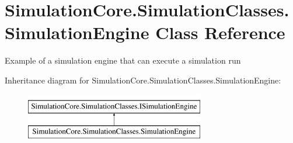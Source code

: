 \hypertarget{class_simulation_core_1_1_simulation_classes_1_1_simulation_engine}{}\section{Simulation\+Core.\+Simulation\+Classes.\+Simulation\+Engine Class Reference}
\label{class_simulation_core_1_1_simulation_classes_1_1_simulation_engine}


Example of a simulation engine that can execute a simulation run  


Inheritance diagram for Simulation\+Core.\+Simulation\+Classes.\+Simulation\+Engine\+:\begin{figure}[H]
\begin{center}
\leavevmode
\includegraphics[height=2.000000cm]{class_simulation_core_1_1_simulation_classes_1_1_simulation_engine}
\end{center}
\end{figure}
